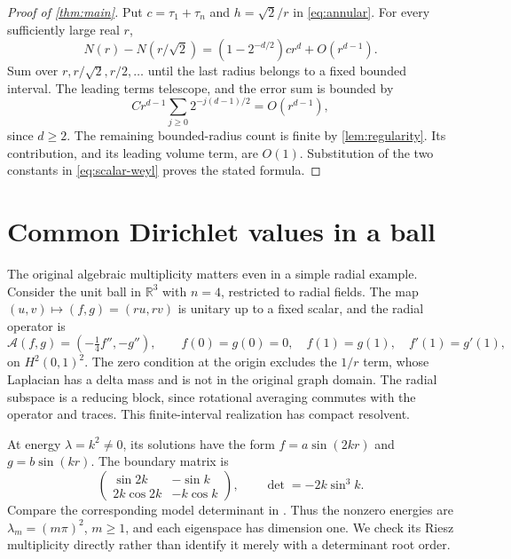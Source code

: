 \documentclass[11pt,a4paper]{article}
\theoremstyle{remark}
\numberwithin{equation}{section}
\begin{document}
\begin{proof}[Proof of \cref{thm:main}]
Put $c=\tau_1+\tau_n$ and $h=\sqrt2/r$ in \eqref{eq:annular}.
For every sufficiently large real $r$,
\[
 N(r)-N(r/\sqrt2)=(1-2^{-d/2})cr^d+O(r^{d-1}).
\]
Sum over $r,r/\sqrt2,r/2,\ldots$ until the last radius belongs to
a fixed bounded interval. The leading terms telescope, and the error
sum is bounded by
\[
 Cr^{d-1}\sum_{j\ge0}2^{-j(d-1)/2}=O(r^{d-1}),
\]
since $d\ge2$. The remaining bounded-radius count is finite by
\cref{lem:regularity}. Its contribution, and its leading volume term,
are $O(1)$. Substitution of the two constants in
\eqref{eq:scalar-weyl} proves the stated formula.
\end{proof}

\appendix
\section{Common Dirichlet values in a ball}\label{app:ball}

The original algebraic multiplicity matters even in a simple radial
example. Consider the unit ball in $\mathbb R^3$ with $n=4$, restricted
to radial fields. The map $(u,v)\mapsto(f,g)=(ru,rv)$ is unitary up to
a fixed scalar, and the radial operator is
\[
 \mathcal A(f,g)=(-\tfrac14 f'',-g''),\qquad
 f(0)=g(0)=0,\quad f(1)=g(1),\quad f'(1)=g'(1),
\]
on $H^2(0,1)^2$. The zero condition at the origin excludes the
$1/r$ term, whose Laplacian has a delta mass and is not in the original
graph domain. The radial subspace is a reducing block, since rotational
averaging commutes with the operator and traces. This finite-interval
realization has compact resolvent.

At energy $\lambda=k^2\ne0$, its solutions have the form
$f=a\sin(2kr)$ and $g=b\sin(kr)$. The boundary matrix is
\begin{equation}\label{eq:ball-matrix}
 \begin{pmatrix}\sin2k&-\sin k\\2k\cos2k&-k\cos k\end{pmatrix},
 \qquad\det=-2k\sin^3k.
\end{equation}
Compare the corresponding model determinant in
\cite[Section~2]{PS}. Thus the nonzero energies are
$\lambda_m=(m\pi)^2$, $m\ge1$, and each eigenspace has dimension one.
We check its Riesz multiplicity directly rather than identify it merely
with a determinant root order.
\end{document}

